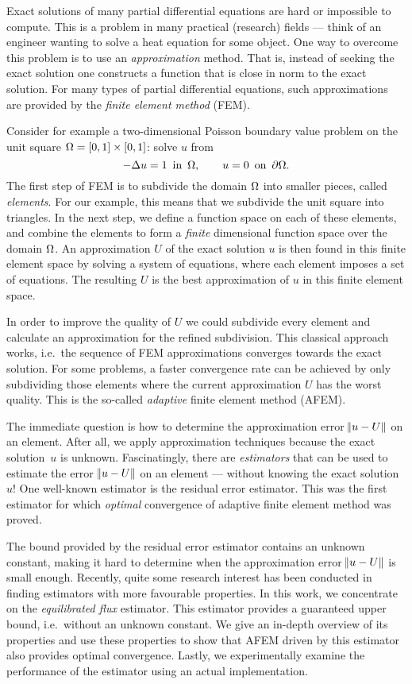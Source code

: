\documentclass[thesis.tex]{subfiles}
\begin{document}
Exact solutions of many partial differential equations are hard or impossible to compute. 
This is a problem in many practical (research) fields --- think of an engineer wanting to solve a heat
equation for some object. One way to overcome this problem is to use an \emph{approximation} method.
That is, instead of seeking the exact solution one constructs a function that is close in norm to the exact solution.
For many types of partial differential equations, such approximations are provided by the \emph{finite element method} (FEM).

Consider for example a two-dimensional Poisson
boundary value problem on the unit square $\Omega = [0,1] \times [0,1]$: solve $u$ from
\[
  -\Delta u = 1 \,\,\, \text{in} \,\,\, \Omega, \quad\quad u = 0 \,\,\, \text{on} \,\,\,\partial \Omega.
\]
The first step of FEM is to subdivide the domain $\Omega$ into smaller pieces, called \emph{elements}. 
For our example, this means that
we subdivide the unit square into triangles. In the next step, we define a function space on each of these elements, and
combine the elements to form a \emph{finite} dimensional function space over the domain $\Omega$. An approximation $U$ of the exact solution $u$
is then found in this finite element space by solving a system of equations, where each element imposes a set of equations.
The resulting $U$ is the best approximation of  $u$  in this finite element space.

In order to improve the quality of $U$ we could subdivide every element and calculate an approximation for the
refined subdivision. This classical approach works, i.e.~the sequence of FEM approximations converges towards the exact solution.
For some problems, a faster convergence rate can be achieved by only subdividing
those elements where the current approximation $U$ has the worst quality. This is the so-called \emph{adaptive} finite element method (AFEM).

The immediate question is how to determine the approximation error $\norm{u - U}$ on an element. After all, we apply approximation techniques
because the exact solution~$u$ is unknown. Fascinatingly, there are \emph{estimators} that can be used
to estimate the error $\norm{u - U}$ on an element --- without knowing the exact solution $u$! One well-known
estimator is the residual error estimator. This was the first estimator for which \emph{optimal} convergence of adaptive finite element 
method was proved. 

The bound provided by the residual error estimator contains an unknown constant, making it hard to determine when
the approximation error $\norm{u - U}$ is small enough.
Recently, quite some research interest has been conducted in finding estimators with more favourable properties. 
In this work, we concentrate on the \emph{equilibrated flux} estimator. This estimator provides a guaranteed upper bound, i.e.~without
an unknown constant.
We give an in-depth overview of its properties and use these properties to show that AFEM driven by this estimator also provides optimal convergence.
Lastly, we experimentally examine the performance of the estimator using an actual implementation.
\end{document}
